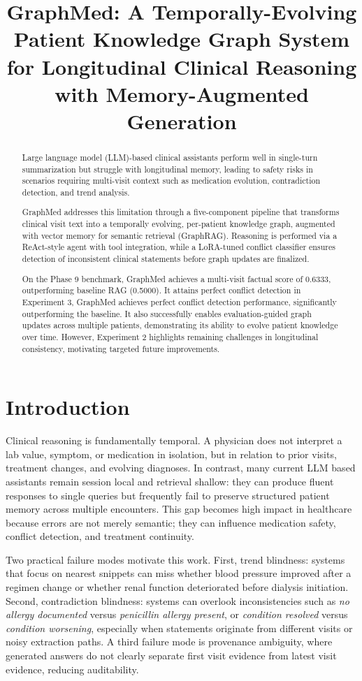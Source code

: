 \documentclass[conference]{IEEEtran}
\title{GraphMed: A Temporally-Evolving Patient Knowledge Graph System for Longitudinal Clinical Reasoning with Memory-Augmented Generation}
\author{\IEEEauthorblockN{Abhsiek Patil}
\IEEEauthorblockA{PES UNIVERSITY\\
Bangalore\\
patilrajakumar80@gmail.com}}
\begin{document}
\maketitle

\begin{abstract}
Large language model (LLM)-based clinical assistants perform well in single-turn summarization but struggle with longitudinal memory, leading to safety risks in scenarios requiring multi-visit context such as medication evolution, contradiction detection, and trend analysis.

GraphMed addresses this limitation through a five-component pipeline that transforms clinical visit text into a temporally evolving, per-patient knowledge graph, augmented with vector memory for semantic retrieval (GraphRAG). Reasoning is performed via a ReAct-style agent with tool integration, while a LoRA-tuned conflict classifier ensures detection of inconsistent clinical statements before graph updates are finalized.

On the Phase 9 benchmark, GraphMed achieves a multi-visit factual score of 0.6333, outperforming baseline RAG (0.5000). It attains perfect conflict detection in Experiment 3, GraphMed achieves perfect conflict detection performance, significantly outperforming the baseline. It also successfully enables evaluation-guided graph updates across multiple patients, demonstrating its ability to evolve patient knowledge over time. However, Experiment 2 highlights remaining challenges in longitudinal consistency, motivating targeted future improvements.
\end{abstract}

\section{Introduction}
Clinical reasoning is fundamentally temporal. A physician does not interpret a lab value, symptom, or medication in isolation, but in relation to prior visits, treatment changes, and evolving diagnoses. In contrast, many current LLM based assistants remain session local and retrieval shallow: they can produce fluent responses to single queries but frequently fail to preserve structured patient memory across multiple encounters. This gap becomes high impact in healthcare because errors are not merely semantic; they can influence medication safety, conflict detection, and treatment continuity.

Two practical failure modes motivate this work. First, trend blindness: systems that focus on nearest snippets can miss whether blood pressure improved after a regimen change or whether renal function deteriorated before dialysis initiation. Second, contradiction blindness: systems can overlook inconsistencies such as \textit{no allergy documented} versus \textit{penicillin allergy present}, or \textit{condition resolved} versus \textit{condition worsening}, especially when statements originate from different visits or noisy extraction paths. A third failure mode is provenance ambiguity, where generated answers do not clearly separate first visit evidence from latest visit evidence, reducing auditability.
\end{document}
